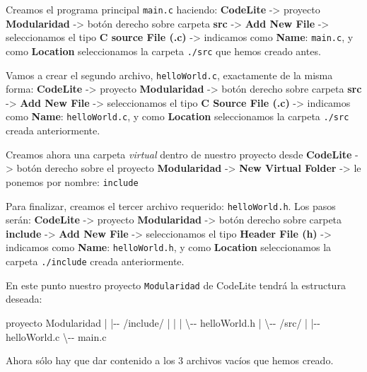\documentclass[
]{book}
\newenvironment{Shaded}{\begin{snugshade}}{\end{snugshade}}
\newcommand{\NormalTok}[1]{#1}
\begin{document}
Creamos el programa principal \texttt{main.c} haciendo: \textbf{CodeLite} -\textgreater{} proyecto \textbf{Modularidad} -\textgreater{} botón derecho sobre carpeta \textbf{src} -\textgreater{} \textbf{Add New File} -\textgreater{} seleccionamos el tipo \textbf{C source File (.c)} -\textgreater{} indicamos como \textbf{Name}: \texttt{main.c}, y como \textbf{Location} seleccionamos la carpeta \texttt{./src} que hemos creado antes.

Vamos a crear el segundo archivo, \texttt{helloWorld.c}, exactamente de la misma forma: \textbf{CodeLite} -\textgreater{} proyecto \textbf{Modularidad} -\textgreater{} botón derecho sobre carpeta \textbf{src} -\textgreater{} \textbf{Add New File} -\textgreater{} seleccionamos el tipo \textbf{C Source File (.c)} -\textgreater{} indicamos como \textbf{Name}: \texttt{helloWorld.c}, y como \textbf{Location} seleccionamos la carpeta \texttt{./src} creada anteriormente.

Creamos ahora una carpeta \emph{virtual} dentro de nuestro proyecto desde \textbf{CodeLite} -\textgreater{} botón derecho sobre el proyecto \textbf{Modularidad} -\textgreater{} \textbf{New Virtual Folder} -\textgreater{} le ponemos por nombre: \texttt{include}

Para finalizar, creamos el tercer archivo requerido: \texttt{helloWorld.h}. Los pasos serán: \textbf{CodeLite} -\textgreater{} proyecto \textbf{Modularidad} -\textgreater{} botón derecho sobre carpeta \textbf{include} -\textgreater{} \textbf{Add New File} -\textgreater{} seleccionamos el tipo \textbf{Header File (h)} -\textgreater{} indicamos como \textbf{Name}: \texttt{helloWorld.h}, y como \textbf{Location} seleccionamos la carpeta \texttt{./include} creada anteriormente.

En este punto nuestro proyecto \texttt{Modularidad} de CodeLite tendrá la estructura deseada:

\begin{Shaded}
\begin{Highlighting}[]
\NormalTok{proyecto Modularidad}
\NormalTok{   |}
\NormalTok{   |{-}{-} /include/}
\NormalTok{   |     |}
\NormalTok{   |     \textbackslash{}{-}{-} helloWorld.h}
\NormalTok{   |}
\NormalTok{   \textbackslash{}{-}{-} /src/}
\NormalTok{         |}
\NormalTok{         |{-}{-} helloWorld.c}
\NormalTok{         \textbackslash{}{-}{-} main.c}
\end{Highlighting}
\end{Shaded}

Ahora sólo hay que dar contenido a los 3 archivos vacíos que hemos creado.
\end{document}
